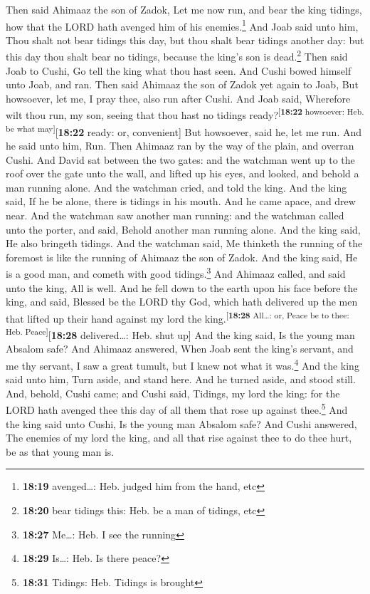  Then said Ahimaaz the son of Zadok, Let me now run, and
bear the king tidings, how that the LORD hath avenged him of his
enemies.\footnote{\textbf{18:19} avenged\ldots: Heb. judged him from the
  hand, etc}  And Joab said unto him, Thou shalt not bear
tidings this day, but thou shalt bear tidings another day: but this day
thou shalt bear no tidings, because the king's son is dead.\footnote{\textbf{18:20}
  bear tidings this: Heb. be a man of tidings, etc}  Then
said Joab to Cushi, Go tell the king what thou hast seen. And Cushi
bowed himself unto Joab, and ran.  Then said Ahimaaz the
son of Zadok yet again to Joab, But howsoever, let me, I pray thee, also
run after Cushi. And Joab said, Wherefore wilt thou run, my son, seeing
that thou hast no tidings ready?\textsuperscript{{[}\textbf{18:22}
howsoever: Heb. be what may{]}}{[}\textbf{18:22} ready: or,
convenient{]}  But howsoever, said he, let me run. And he
said unto him, Run. Then Ahimaaz ran by the way of the plain, and
overran Cushi.  And David sat between the two gates: and
the watchman went up to the roof over the gate unto the wall, and lifted
up his eyes, and looked, and behold a man running alone. 
And the watchman cried, and told the king. And the king said, If he be
alone, there is tidings in his mouth. And he came apace, and drew near.
 And the watchman saw another man running: and the
watchman called unto the porter, and said, Behold another man running
alone. And the king said, He also bringeth tidings.  And
the watchman said, Me thinketh the running of the foremost is like the
running of Ahimaaz the son of Zadok. And the king said, He is a good
man, and cometh with good tidings.\footnote{\textbf{18:27} Me\ldots:
  Heb. I see the running}  And Ahimaaz called, and said
unto the king, All is well. And he fell down to the earth upon his face
before the king, and said, Blessed be the LORD thy God, which hath
delivered up the men that lifted up their hand against my lord the
king.\textsuperscript{{[}\textbf{18:28} All\ldots: or, Peace be to thee:
Heb. Peace{]}}{[}\textbf{18:28} delivered\ldots: Heb. shut up{]}
 And the king said, Is the young man Absalom safe? And
Ahimaaz answered, When Joab sent the king's servant, and me thy servant,
I saw a great tumult, but I knew not what it was.\footnote{\textbf{18:29}
  Is\ldots: Heb. Is there peace?}  And the king said unto
him, Turn aside, and stand here. And he turned aside, and stood still.
 And, behold, Cushi came; and Cushi said, Tidings, my
lord the king: for the LORD hath avenged thee this day of all them that
rose up against thee.\footnote{\textbf{18:31} Tidings: Heb. Tidings is
  brought}  And the king said unto Cushi, Is the young
man Absalom safe? And Cushi answered, The enemies of my lord the king,
and all that rise against thee to do thee hurt, be as that young man is.

